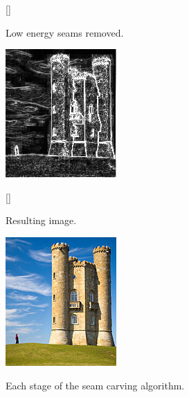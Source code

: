 \begin{figure}[htp]
    \begin{subfloatrow}
        [\FBwidth]
        {\caption{Low energy seams removed.}\label{fig:scRemoved}}
        {\includegraphics[scale=.7]{figures/seamCarving4.png}}
    \end{subfloatrow}
    \begin{subfloatrow}
        [\FBwidth]
        {\caption{Resulting image.}}
        {\includegraphics[scale=.7]{figures/seamCarving5.png}}
    \end{subfloatrow}
    \caption[Seam Carving Stages]{Each stage of the seam carving algorithm.}
\end{figure}



\pagebreak



